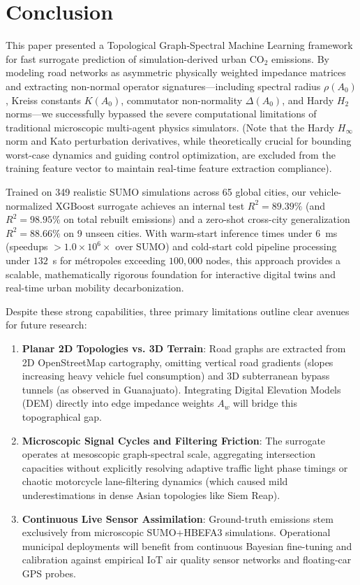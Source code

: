 \documentclass[lettersize,journal]{IEEEtran}
\begin{document}
\section{Conclusion}
This paper presented a Topological Graph-Spectral Machine Learning framework for fast surrogate prediction of simulation-derived urban $\text{CO}_2$ emissions. By modeling road networks as asymmetric physically weighted impedance matrices and extracting non-normal operator signatures—including spectral radius $\rho(A_0)$, Kreiss constants $K(A_0)$, commutator non-normality $\Delta(A_0)$, and Hardy $H_2$ norms—we successfully bypassed the severe computational limitations of traditional microscopic multi-agent physics simulators. (Note that the Hardy $H_\infty$ norm and Kato perturbation derivatives, while theoretically crucial for bounding worst-case dynamics and guiding control optimization, are excluded from the training feature vector to maintain real-time feature extraction compliance). 

Trained on 349 realistic SUMO simulations across 65 global cities, our vehicle-normalized XGBoost surrogate achieves an internal test $R^2 = 89.39\%$ (and $R^2 = 98.95\%$ on total rebuilt emissions) and a zero-shot cross-city generalization $R^2 = 88.66\%$ on 9 unseen cities. With warm-start inference times under $6$~ms (speedups $>1.0 \times 10^6 \times$ over SUMO) and cold-start cold pipeline processing under $132$~s for métropoles exceeding $100,000$ nodes, this approach provides a scalable, mathematically rigorous foundation for interactive digital twins and real-time urban mobility decarbonization.

Despite these strong capabilities, three primary limitations outline clear avenues for future research:
\begin{enumerate}
    \item \textbf{Planar 2D Topologies vs. 3D Terrain}: Road graphs are extracted from 2D OpenStreetMap cartography, omitting vertical road gradients (slopes increasing heavy vehicle fuel consumption) and 3D subterranean bypass tunnels (as observed in Guanajuato). Integrating Digital Elevation Models (DEM) directly into edge impedance weights $A_w$ will bridge this topographical gap.
    \item \textbf{Microscopic Signal Cycles and Filtering Friction}: The surrogate operates at mesoscopic graph-spectral scale, aggregating intersection capacities without explicitly resolving adaptive traffic light phase timings or chaotic motorcycle lane-filtering dynamics (which caused mild underestimations in dense Asian topologies like Siem Reap).
    \item \textbf{Continuous Live Sensor Assimilation}: Ground-truth emissions stem exclusively from microscopic SUMO+HBEFA3 simulations. Operational municipal deployments will benefit from continuous Bayesian fine-tuning and calibration against empirical IoT air quality sensor networks and floating-car GPS probes.
\end{enumerate}
\end{document}
